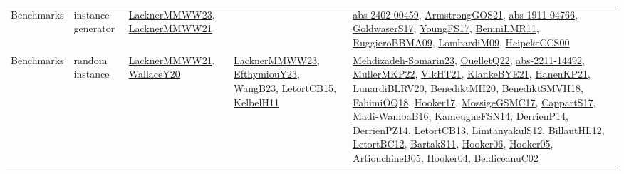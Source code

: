 {\begin{longtable}{lp{3cm}>{\raggedright}p{6cm}>{\raggedright}p{6cm}p{8cm}}
Benchmarks & instance generator & \href{articles/LacknerMMWW23.pdf}{LacknerMMWW23}\cite{LacknerMMWW23}, \href{papers/LacknerMMWW21.pdf}{LacknerMMWW21}\cite{LacknerMMWW21} &  & \href{articles/abs-2402-00459.pdf}{abs-2402-00459}\cite{abs-2402-00459}, \href{papers/ArmstrongGOS21.pdf}{ArmstrongGOS21}\cite{ArmstrongGOS21}, \href{articles/abs-1911-04766.pdf}{abs-1911-04766}\cite{abs-1911-04766}, \href{papers/GoldwaserS17.pdf}{GoldwaserS17}\cite{GoldwaserS17}, \href{papers/YoungFS17.pdf}{YoungFS17}\cite{YoungFS17}, \href{articles/BeniniLMR11.pdf}{BeniniLMR11}\cite{BeniniLMR11}, \href{articles/RuggieroBBMA09.pdf}{RuggieroBBMA09}\cite{RuggieroBBMA09}, \href{papers/LombardiM09.pdf}{LombardiM09}\cite{LombardiM09}, \href{articles/HeipckeCCS00.pdf}{HeipckeCCS00}\cite{HeipckeCCS00}\\
Benchmarks & random instance & \href{papers/LacknerMMWW21.pdf}{LacknerMMWW21}\cite{LacknerMMWW21}, \href{articles/WallaceY20.pdf}{WallaceY20}\cite{WallaceY20} & \href{articles/LacknerMMWW23.pdf}{LacknerMMWW23}\cite{LacknerMMWW23}, \href{papers/EfthymiouY23.pdf}{EfthymiouY23}\cite{EfthymiouY23}, \href{papers/WangB23.pdf}{WangB23}\cite{WangB23}, \href{articles/LetortCB15.pdf}{LetortCB15}\cite{LetortCB15}, \href{articles/KelbelH11.pdf}{KelbelH11}\cite{KelbelH11} & \href{papers/Mehdizadeh-Somarin23.pdf}{Mehdizadeh-Somarin23}\cite{Mehdizadeh-Somarin23}, \href{papers/OuelletQ22.pdf}{OuelletQ22}\cite{OuelletQ22}, \href{articles/abs-2211-14492.pdf}{abs-2211-14492}\cite{abs-2211-14492}, \href{articles/MullerMKP22.pdf}{MullerMKP22}\cite{MullerMKP22}, \href{articles/VlkHT21.pdf}{VlkHT21}\cite{VlkHT21}, \href{papers/KlankeBYE21.pdf}{KlankeBYE21}\cite{KlankeBYE21}, \href{papers/HanenKP21.pdf}{HanenKP21}\cite{HanenKP21}, \href{articles/LunardiBLRV20.pdf}{LunardiBLRV20}\cite{LunardiBLRV20}, \href{articles/BenediktMH20.pdf}{BenediktMH20}\cite{BenediktMH20}, \href{papers/BenediktSMVH18.pdf}{BenediktSMVH18}\cite{BenediktSMVH18}, \href{articles/FahimiOQ18.pdf}{FahimiOQ18}\cite{FahimiOQ18}, \href{papers/Hooker17.pdf}{Hooker17}\cite{Hooker17}, \href{papers/MossigeGSMC17.pdf}{MossigeGSMC17}\cite{MossigeGSMC17}, \href{papers/CappartS17.pdf}{CappartS17}\cite{CappartS17}, \href{papers/Madi-WambaB16.pdf}{Madi-WambaB16}\cite{Madi-WambaB16}, \href{articles/KameugneFSN14.pdf}{KameugneFSN14}\cite{KameugneFSN14}, \href{papers/DerrienP14.pdf}{DerrienP14}\cite{DerrienP14}, \href{papers/DerrienPZ14.pdf}{DerrienPZ14}\cite{DerrienPZ14}, \href{papers/LetortCB13.pdf}{LetortCB13}\cite{LetortCB13}, \href{articles/LimtanyakulS12.pdf}{LimtanyakulS12}\cite{LimtanyakulS12}, \href{papers/BillautHL12.pdf}{BillautHL12}\cite{BillautHL12}, \href{papers/LetortBC12.pdf}{LetortBC12}\cite{LetortBC12}, \href{articles/BartakS11.pdf}{BartakS11}\cite{BartakS11}, \href{articles/Hooker06.pdf}{Hooker06}\cite{Hooker06}, \href{articles/Hooker05.pdf}{Hooker05}\cite{Hooker05}, \href{papers/ArtiouchineB05.pdf}{ArtiouchineB05}\cite{ArtiouchineB05}, \href{papers/Hooker04.pdf}{Hooker04}\cite{Hooker04}, \href{papers/BeldiceanuC02.pdf}{BeldiceanuC02}\cite{BeldiceanuC02}\\

\end{longtable}}

